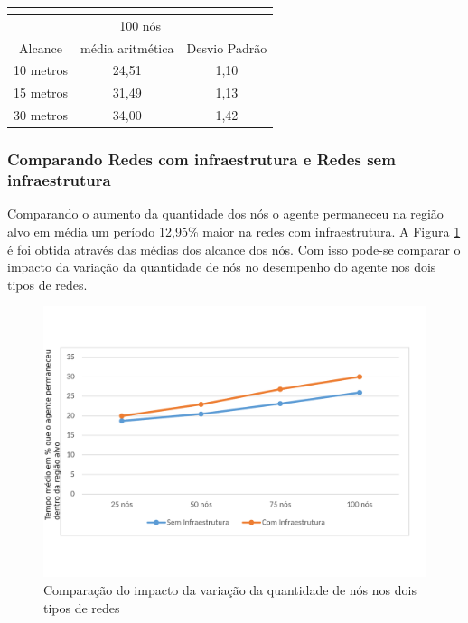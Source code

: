 \begin{table}[!htb]
\begin{minipage}{.5\linewidth}
\begin{tabular}{|c|c|c|}
			\multicolumn{3}{|c|}{} \\ \hline


			\multicolumn{3}{|c|}{100 nós} \\ \hline
			Alcance   & média aritmética &	Desvio Padrão   \\ \hline
			10 metros &	24,51 & 1,10   \\ \hline
			15 metros &	31,49 & 1,13   \\ \hline
			30 metros &	34,00 & 1,42  \\ \hline

		\end{tabular}

	    \end{minipage} 
	\end{table}  


\subsubsection{Comparando Redes com infraestrutura e Redes sem infraestrutura}

Comparando o aumento da quantidade dos nós o agente permaneceu na região alvo em média um período 12,95\% maior na redes com infraestrutura. A Figura \ref{fig:comparacaoVariacaoNos} é foi obtida através das médias dos alcance dos nós. Com isso pode-se comparar o impacto da variação da quantidade de nós no desempenho do agente nos dois tipos de redes. 

\begin{figure}[htbp]
	\centering
	\includegraphics[scale=0.34]{resultados/graficos/comparacaoVariacaoNos.pdf}
	\caption{Comparação do impacto da variação da quantidade de nós nos dois tipos de redes}
	\label{fig:comparacaoVariacaoNos}
\end{figure}  


